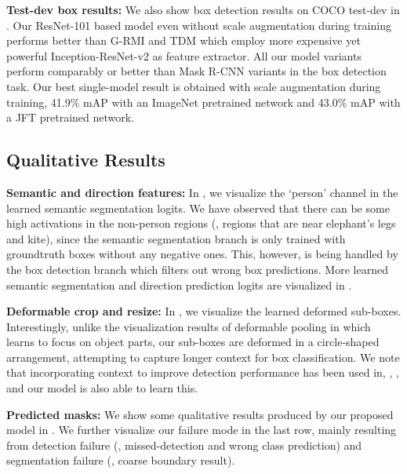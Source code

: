 \textbf{Test-dev box results:} We also show box detection results on COCO test-dev in . Our ResNet-101 based model even without scale augmentation during training performs better than G-RMI \cite{huang2016speed} and TDM \cite{shrivastava2016beyond} which employ more expensive yet powerful Inception-ResNet-v2 \cite{szegedy2017inception} as feature extractor. All our model variants perform comparably or better than Mask R-CNN variants in the box detection task. Our best single-model result is obtained with scale augmentation during training, 41.9\% mAP with an ImageNet pretrained network and 43.0\% mAP with a JFT pretrained network.

\subsection{Qualitative Results}

\textbf{Semantic and direction features:} In , we visualize the `person' channel in the learned semantic segmentation logits. We have observed that there can be some high activations in the non-person regions (\eg, regions that are near elephant's legs and kite), since the semantic segmentation branch is only trained with groundtruth boxes without any negative ones. This, however, is being handled by the box detection branch which filters out wrong box predictions. More learned semantic segmentation and direction prediction logits are visualized in .

\textbf{Deformable crop and resize:} In , we visualize the learned deformed sub-boxes. Interestingly, unlike the visualization results of deformable pooling in \cite{dai2017deformable} which learns to focus on object parts, our sub-boxes are deformed in a circle-shaped arrangement, attempting to capture longer context for box classification. We note that incorporating context to improve detection performance has been used in, \eg, \cite{gidaris2015object, zhu2015segdeepm,Zagoruyko2016Multipath}, and our model is also able to learn this.

\textbf{Predicted masks:} We show some qualitative results produced by our proposed model in . We further visualize our failure mode in the last row, mainly resulting from detection failure (\eg, missed-detection and wrong class prediction) and segmentation failure (\eg, coarse boundary result).

